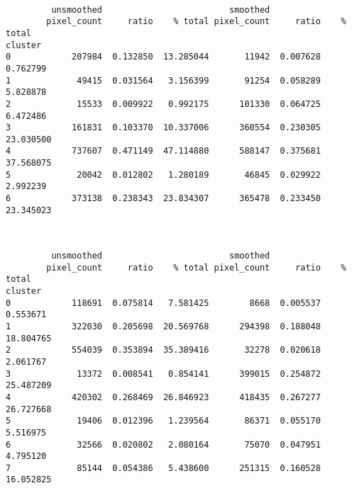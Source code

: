 \documentclass[11pt]{article}
\begin{document}
    
    \begin{center}
    \end{center}
    { \hspace*{\fill} \\}
    
    
    \begin{verbatim}
         unsmoothed                         smoothed                     
        pixel_count     ratio    % total pixel_count     ratio    % total
cluster                                                                  
0            207984  0.132850  13.285044       11942  0.007628   0.762799
1             49415  0.031564   3.156399       91254  0.058289   5.828878
2             15533  0.009922   0.992175      101330  0.064725   6.472486
3            161831  0.103370  10.337006      360554  0.230305  23.030500
4            737607  0.471149  47.114880      588147  0.375681  37.568075
5             20042  0.012802   1.280189       46845  0.029922   2.992239
6            373138  0.238343  23.834307      365478  0.233450  23.345023
    \end{verbatim}

    
    \begin{center}
    \end{center}
    { \hspace*{\fill} \\}
    
    
    \begin{verbatim}
         unsmoothed                         smoothed                     
        pixel_count     ratio    % total pixel_count     ratio    % total
cluster                                                                  
0            118691  0.075814   7.581425        8668  0.005537   0.553671
1            322030  0.205698  20.569768      294398  0.188048  18.804765
2            554039  0.353894  35.389416       32278  0.020618   2.061767
3             13372  0.008541   0.854141      399015  0.254872  25.487209
4            420302  0.268469  26.846923      418435  0.267277  26.727668
5             19406  0.012396   1.239564       86371  0.055170   5.516975
6             32566  0.020802   2.080164       75070  0.047951   4.795120
7             85144  0.054386   5.438600      251315  0.160528  16.052825
    \end{verbatim}

    
    \begin{center}
    \end{center}
    { \hspace*{\fill} \\}
    
\end{document}
